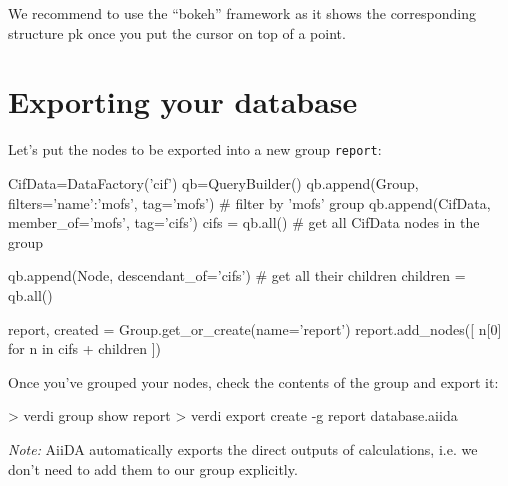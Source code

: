 \documentclass[twoside,a4paper,11pt]{extarticle}
\begin{document}
We recommend to use the ``bokeh'' framework as it shows the corresponding structure pk once you put the cursor on top of a point. 

\section{Exporting your database}
Let's put the nodes to be exported into a new group \verb|report|:
\begin{pythoncommand}
CifData=DataFactory('cif')
qb=QueryBuilder()
qb.append(Group, filters={'name':'mofs'}, tag='mofs')  # filter by 'mofs' group
qb.append(CifData, member_of='mofs', tag='cifs')
cifs = qb.all()  # get all CifData nodes in the group

qb.append(Node, descendant_of='cifs')  # get all their children
children = qb.all()

report, created = Group.get_or_create(name='report')
report.add_nodes([ n[0] for n in cifs + children ])
\end{pythoncommand}

Once you've grouped your nodes, check the contents of the group and export it:
\begin{bashcommand}
> verdi group show report
> verdi export create -g report database.aiida
\end{bashcommand}
\emph{Note:} AiiDA automatically exports the direct outputs of calculations,
i.e. we don't need to add them to our group explicitly.
\end{document}
